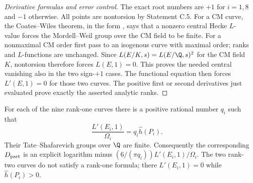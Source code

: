 \begin{proof}[Derivative formulas and error control]
The exact root numbers are $+1$ for $i=1,8$ and $-1$ otherwise.
All points are nontorsion by Statement C.5. For a CM curve,
the Coates--Wiles theorem, in the form
\citet[Theorem 10.1]{CrRubin1999}, says that a nonzero central
Hecke $L$-value forces the Mordell--Weil group over the CM field
to be finite. For a nonmaximal CM order first pass to an isogenous
curve with maximal order; ranks and $L$-functions are unchanged.
Since $L(E/K,s)=L(E/\Q,s)^2$ for the CM field $K$, nontorsion
therefore forces $L(E,1)=0$. This proves the needed central
vanishing also in the two sign-$+1$ cases. The functional equation
then forces $L'(E,1)=0$ for those two curves. The positive first
or second derivatives just evaluated prove exactly the asserted
analytic ranks.
\end{proof}

\begin{proposition}\label{ari:C.6.R3}
For each of the nine rank-one curves there is a positive rational
number $q_i$ such that
\begin{equation}\label{ari:eq:Cr-rational-factor}
 \frac{L'(E_i,1)}{\Omega_i}=q_i\widehat h(P_i).
\end{equation}
Their Tate--Shafarevich groups over $\Q$ are finite. Consequently
the corresponding $D_{\rm part}$ is an explicit logarithm minus
$(6/(\pi q_i))L'(E_i,1)/\Omega_i$. The two rank-two curves do
not satisfy a rank-one formula; there $L'(E_i,1)=0$ while
$\widehat h(P_i)>0$.
\end{proposition}

